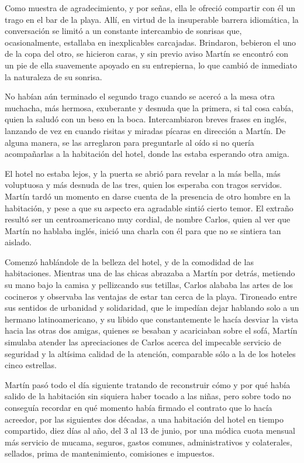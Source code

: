 \documentclass[12pt,twoside,openright,a5paper]{book}
\begin{document}
Como muestra de agradecimiento, y por señas, ella le ofreció
compartir con él un trago en el bar de la playa. Allí, en virtud de la
insuperable barrera idiomática, la conversación se limitó a un constante
intercambio de sonrisas que, ocasionalmente, estallaba en inexplicables
carcajadas. Brindaron, bebieron el uno de la copa del otro, se hicieron caras,
y sin previo aviso Martín se encontró con un pie de ella suavemente apoyado
en su entrepierna, lo que cambió de inmediato la naturaleza de su sonrisa.

No habían aún terminado el segundo trago cuando se acercó a la mesa
otra muchacha, más hermosa, exuberante y desnuda que la primera, si tal
cosa cabía, quien la saludó con un beso en la boca. Intercambiaron breves
frases en inglés, lanzando de vez en cuando risitas y miradas pícaras en
dirección a Martín. De alguna manera, se las arreglaron para preguntarle
al oído si no quería acompañarlas a la habitación del hotel, donde las
estaba esperando otra amiga.

El hotel no estaba lejos, y la puerta se abrió para revelar a la más bella,
más voluptuosa y más desnuda de las tres, quien los esperaba con tragos
servidos. Martín tardó un momento en darse cuenta de la presencia de otro
hombre en la habitación, y pese a que su aspecto era agradable sintió
cierto temor. El extraño resultó ser un centroamericano muy cordial,
de nombre Carlos, quien al ver que Martín no hablaba inglés, inició una
charla con él para que no se sintiera tan aislado.

Comenzó hablándole de la belleza del hotel, y de la comodidad de las
habitaciones. Mientras una de las chicas abrazaba a Martín por detrás,
metiendo su mano bajo la camisa y pellizcando sus tetillas, Carlos alababa
las artes de los cocineros y observaba las ventajas de estar tan cerca de
la playa. Tironeado entre sus sentidos de urbanidad y solidaridad, que le
impedían dejar hablando solo a un hermano latinoamericano, y su libido
que constantemente le hacía desviar la vista hacia las otras dos amigas,
quienes se besaban y acariciaban sobre el sofá, Martín simulaba atender
las apreciaciones de Carlos acerca del impecable servicio de seguridad y
la altísima calidad de la atención, comparable sólo a la de los hoteles
cinco estrellas.

Martín pasó todo el día siguiente tratando de reconstruir cómo y por qué
había salido de la habitación sin siquiera haber tocado a las niñas, pero
sobre todo no conseguía recordar en qué momento había firmado el contrato
que lo hacía acreedor, por las siguientes dos décadas, a una habitación
del hotel en tiempo compartido, diez días al año, del 3 al 13 de junio,
por una módica cuota mensual más servicio de mucama, seguros, gastos
comunes, administrativos y colaterales, sellados, prima de mantenimiento,
comisiones e impuestos.
\end{document}
